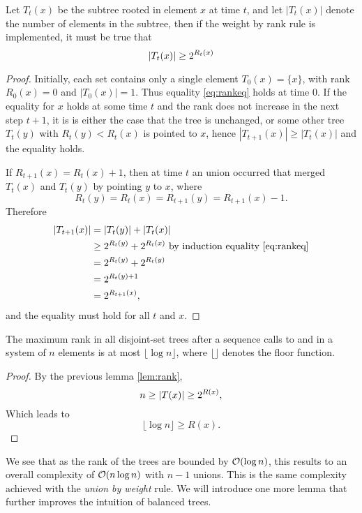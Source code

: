 \begin{lemma}\label{lem:rank}
  Let $T_t(x)$ be the subtree rooted in element $x$ at time $t$, and let $|T_t(x)|$ denote the number of elements in the subtree, then if the weight by rank rule is implemented, it must be true that 
  \begin{equation}\label{eq:rankeq}
    \abs{T_t(x)} \geq 2^{R_t(x)}
  \end{equation}
\end{lemma}
\begin{proof}
  Initially, each set contains only a single element $T_0(x) = \{x\}$, with rank $R_0(x)=0$ and $|T_0(x)|=1$. Thus equality \eqref{eq:rankeq} holds at time $0$. If the equality for $x$ holds at some time $t$ and the rank does not increase in the next step $t+1$, it is is either the case that the tree is unchanged, or some other tree $T_t(y)$ with $R_t(y)<R_t(x)$ is pointed to $x$, hence $|T_{t+1}(x)| \geq  |T_t(x)|$ and the equality holds. 
  
  If $R_{t+1}(x) = R_t(x) + 1$, then at time $t$ an union occurred that merged $T_t(x)$ and $T_t(y)$ by pointing $y$ to $x$, where
  \begin{equation*}
    R_t(y) = R_t(x) = R_{t+1}(y) = R_{t+1}(x) - 1.
  \end{equation*}
  Therefore
  \begin{align*}
    \abs{T_{t+1}(x)} &= \abs{T_t(y)} + \abs{T_t(x)} \\
      &\geq 2^{R_t(y)} + 2^{R_t(x)} \text{ by induction equality \eqref{eq:rankeq}} \\
      &= 2^{R_t(y)} + 2^{R_t(y)} \\
      &= 2^{R_t(y)+1} \\
      &= 2^{R_{t+1}(x)},
  \end{align*}
  and the equality must hold for all $t$ and $x$. 
\end{proof}
\begin{lemma}\label{lem:maxrank}
    The maximum rank in all disjoint-set trees after a sequence calls to  and  in a system of $n$ elements is at most $\lfloor \log n \rfloor$, where $\lfloor \rfloor$ denotes the floor function. 
\end{lemma}
\begin{proof}
    By the previous lemma \ref{lem:rank}, 
    \begin{equation*}
        n \geq \abs{T(x)} \geq 2^{R(x)}, 
    \end{equation*}
    Which leads to 
    \begin{equation*}
        \lfloor \log n \rfloor \geq R(x).
    \end{equation*}
\end{proof}
We see that as the rank of the trees are bounded by $\mathcal{O}(\log n)$, this results to an overall complexity of $\mathcal{O}(n\log n)$ with $n-1$ unions. This is the same complexity achieved with the \emph{union by weight} rule. We will introduce one more lemma that further improves the intuition of balanced trees. 

